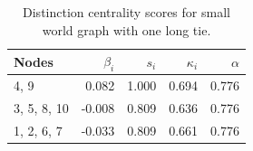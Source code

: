 \begin{table}
\centering
\caption{\label{tab:sw1}Distinction centrality scores for small world graph with one long tie.}
\centering
\begin{tabular}[t]{lrrrr}
\toprule
Nodes & $\beta_i$ & $s_i$ & $\kappa_i$ & $\alpha$\\
\midrule
4, 9 & 0.082 & 1.000 & 0.694 & 0.776\\
3, 5, 8, 10 & -0.008 & 0.809 & 0.636 & 0.776\\
1, 2, 6, 7 & -0.033 & 0.809 & 0.661 & 0.776\\
\bottomrule
\end{tabular}
\end{table}
